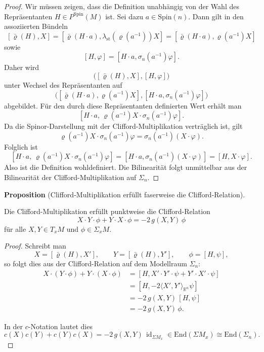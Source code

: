 \documentclass[10pt, letterpaper]{article}
\newcommand{\id}{\operatorname{id}}
\newcommand{\R}{\mathbb{R}}
\newcommand{\End}{\mathrm{End}}
\newcommand{\Spin}{\mathrm{Spin}}
\newcommand{\CustomHeading}[3]{%
  \par\medskip\noindent%
  \textbf{#1 #2} \textnormal{(#3)}.\enskip%
}
\newenvironment{PROP}[2]{\CustomHeading{Proposition}{#1}{#2}}{}
\begin{document}
\begin{proof}
Wir müssen zeigen, dass die Definition unabhängig von der Wahl des Repräsentanten
\(H\in P^{\Spin}(M)\) ist. Sei dazu \(a\in \Spin(n)\). Dann gilt in den
assoziierten Bündeln
\[
[\bar\varrho(H),X]
=
[\bar\varrho(H\cdot a),\lambda_{\mathrm{st}}(\varrho(a^{-1}))X]
=
[\bar\varrho(H\cdot a),\varrho(a^{-1})X]
\]
sowie
\[
[H,\varphi]=[H\cdot a,\sigma_n(a^{-1})\varphi].
\]
Daher wird
\[
\bigl([\bar\varrho(H),X],[H,\varphi]\bigr)
\]
unter Wechsel des Repräsentanten auf
\[
\bigl([\bar\varrho(H\cdot a),\varrho(a^{-1})X],[H\cdot a,\sigma_n(a^{-1})\varphi]\bigr)
\]
abgebildet. Für den durch diese Repräsentanten definierten Wert erhält man
\[
[H\cdot a,\,\varrho(a^{-1})X\cdot \sigma_n(a^{-1})\varphi].
\]
Da die Spinor-Darstellung mit der Clifford-Multiplikation verträglich ist, gilt
\[
\varrho(a^{-1})X\cdot \sigma_n(a^{-1})\varphi
=
\sigma_n(a^{-1})(X\cdot \varphi).
\]
Folglich ist
\[
[H\cdot a,\,\varrho(a^{-1})X\cdot \sigma_n(a^{-1})\varphi]
=
[H\cdot a,\sigma_n(a^{-1})(X\cdot \varphi)]
=
[H,X\cdot \varphi].
\]
Also ist die Definition wohldefiniert. Die Bilinearität folgt unmittelbar aus
der Bilinearität der Clifford-Multiplikation auf \(\Sigma_n\).
\end{proof}

\begin{PROP}{}{Clifford-Multiplikation erfüllt faserweise die Clifford-Relation}
    Die Clifford-Multiplikation erfüllt punktweise die Clifford-Relation
    \[
    X\cdot Y\cdot \phi + Y\cdot X\cdot \phi
    =
    -2\,g(X,Y)\,\phi
    \]
    für alle \(X,Y\in T_xM\) und \(\phi\in \Sigma_xM\).
\end{PROP}

\begin{proof}
    Schreibt man
    \[
    X=[\bar\varrho(H),X'],\qquad
    Y=[\bar\varrho(H),Y'],\qquad
    \phi=[H,\psi],
    \]
    so folgt dies aus der Clifford-Relation auf dem Modellraum \(\Sigma_n\):
    \[
    \begin{aligned}
    X\cdot (Y\cdot \phi)+Y\cdot (X\cdot \phi)
    &=
    [H,X'\cdot Y'\cdot \psi + Y'\cdot X'\cdot \psi] \\
    &=
    [H,-2\langle X',Y'\rangle_{\R^n}\psi] \\
    &=
    -2\,g(X,Y)\,[H,\psi] \\
    &=
    -2\,g(X,Y)\,\phi.
    \end{aligned}
    \]

    In der \(c\)-Notation lautet dies
    \[
    c(X)c(Y)+c(Y)c(X)
    =
    -2\,g(X,Y)\,\id_{\Sigma M_x}\in \End(\Sigma M_x)\cong\End(\Sigma_n).
    \]
\end{proof}
\end{document}
